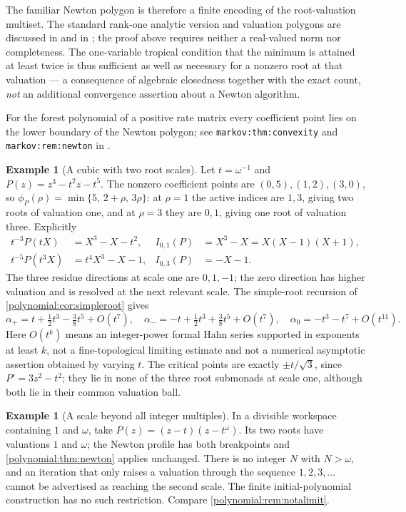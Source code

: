 \documentclass[11pt,letterpaper]{article}
\numberwithin{equation}{section}
\theoremstyle{definition}
\newtheorem{example}[theorem]{Example}
\theoremstyle{remark}\newtheorem{remark}[theorem]{Remark}
\begin{document}
The familiar Newton polygon is therefore a finite encoding of the
root-valuation multiset. The standard rank-one analytic version and valuation
polygons are discussed in \cite[\S3]{polynomial:Benedetto} and in
\cite{polynomial:ChoiLee}; the proof above requires neither a real-valued norm
nor completeness. The one-variable tropical condition that the minimum is
attained at least twice is thus sufficient as well as necessary for a nonzero
root at that valuation --- a consequence of algebraic closedness together with
the exact count, \emph{not} an additional convergence assertion about a Newton
algorithm.

For the forest polynomial of a positive rate matrix every coefficient point
lies on the lower boundary of the Newton polygon; see
\texttt{markov:thm:convexity} and \texttt{markov:rem:newton} in
.

\begin{example}[A cubic with two root scales]\label{polynomial:ex:newtoncubic}
Let $t=\omega^{-1}$ and $P(z)=z^3-t^2z-t^5$. The nonzero coefficient points
are $(0,5),(1,2),(3,0)$, so $\phi_P(\rho)=\min\{5,\,2+\rho,\,3\rho\}$: at
$\rho=1$ the active indices are $1,3$, giving two roots of valuation one, and
at $\rho=3$ they are $0,1$, giving one root of valuation three. Explicitly
\[
\begin{aligned}
 t^{-3}P(tX)&=X^3-X-t^2, & I_{0,1}(P)&=X^3-X=X(X-1)(X+1),\\
 t^{-5}P(t^3X)&=t^4X^3-X-1, & I_{0,3}(P)&=-X-1 .
\end{aligned}
\]
The three residue directions at scale one are $0,1,-1$; the zero direction has
higher valuation and is resolved at the next relevant scale. The simple-root
recursion of \cref{polynomial:cor:simpleroot} gives
\[
 \alpha_+=t+\tfrac12t^3-\tfrac38t^5+O(t^7),\quad
 \alpha_-=-t+\tfrac12t^3+\tfrac38t^5+O(t^7),\quad
 \alpha_0=-t^3-t^7+O(t^{11}).
\]
Here $O(t^k)$ means an integer-power formal Hahn series supported in exponents
at least $k$, not a fine-topological limiting estimate and not a numerical
asymptotic assertion obtained by varying $t$. The critical points are exactly
$\pm t/\sqrt3$, since $P'=3z^2-t^2$; they lie in none of the three root
submonads at scale one, although both lie in their common valuation ball.
\end{example}

\begin{example}[A scale beyond all integer multiples]\label{polynomial:ex:highrank}
In a divisible workspace containing $1$ and $\omega$, take
$P(z)=(z-t)(z-t^\omega)$. Its two roots have valuations $1$ and $\omega$; the
Newton profile has both breakpoints and \cref{polynomial:thm:newton} applies
unchanged. There is no integer $N$ with $N>\omega$, and an iteration that only
raises a valuation through the sequence $1,2,3,\ldots$ cannot be advertised as
reaching the second scale. The finite initial-polynomial construction has no
such restriction. Compare
\cref{polynomial:rem:notalimit}.
\end{example}
\end{document}
